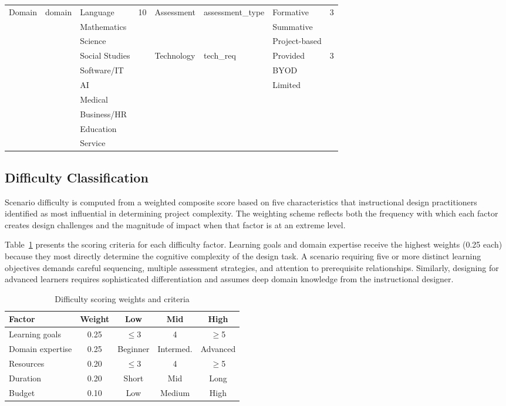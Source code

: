 \begin{table}[t]
\begin{tabular}{llll|llll}
\midrule
\multirow{10}{*}{Domain} & \multirow{10}{*}{domain} & Language & \multirow{10}{*}{10} & \multirow{3}{*}{Assessment} & \multirow{3}{*}{assessment\_type} & Formative & \multirow{3}{*}{3} \\
& & Mathematics & & & & Summative & \\
& & Science & & & & Project-based & \\
& & Social Studies & & \multirow{3}{*}{Technology} & \multirow{3}{*}{tech\_req} & Provided & \multirow{3}{*}{3} \\
& & Software/IT & & & & BYOD & \\
& & AI & & & & Limited & \\
& & Medical & & & & & \\
& & Business/HR & & & & & \\
& & Education & & & & & \\
& & Service & & & & & \\
\bottomrule
\end{tabular}
\end{table}

\subsection{Difficulty Classification}
\label{app:difficulty}

Scenario difficulty is computed from a weighted composite score based on five characteristics that instructional design practitioners identified as most influential in determining project complexity. The weighting scheme reflects both the frequency with which each factor creates design challenges and the magnitude of impact when that factor is at an extreme level.

Table~\ref{tab:difficulty-weights} presents the scoring criteria for each difficulty factor. Learning goals and domain expertise receive the highest weights (0.25 each) because they most directly determine the cognitive complexity of the design task. A scenario requiring five or more distinct learning objectives demands careful sequencing, multiple assessment strategies, and attention to prerequisite relationships. Similarly, designing for advanced learners requires sophisticated differentiation and assumes deep domain knowledge from the instructional designer.

\begin{table}[ht!]
\centering
\small
\caption{Difficulty scoring weights and criteria}
\label{tab:difficulty-weights}
\begin{tabular}{lcccc}
\toprule
\textbf{Factor} & \textbf{Weight} & \textbf{Low} & \textbf{Mid} & \textbf{High} \\
\midrule
Learning goals & 0.25 & $\leq$3 & 4 & $\geq$5 \\
Domain expertise & 0.25 & Beginner & Intermed. & Advanced \\
Resources & 0.20 & $\leq$3 & 4 & $\geq$5 \\
Duration & 0.20 & Short & Mid & Long \\
Budget & 0.10 & Low & Medium & High \\
\bottomrule
\end{tabular}
\end{table}

